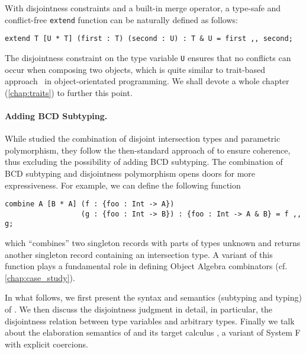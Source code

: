 With disjointness constraints and a built-in merge operator, a type-safe and
conflict-free \lstinline{extend} function can be naturally defined as follows:
\begin{lstlisting}
extend T [U * T] (first : T) (second : U) : T & U = first ,, second;
\end{lstlisting}
The disjointness constraint on the type variable \lstinline{U} ensures that no
conflicts can occur when composing two objects, which is quite similar to
trait-based approach~\citep{scharli2003traits} in object-orientated programming.
We shall devote a whole chapter (\cref{chap:traits}) to further this point.


\paragraph{Adding BCD Subtyping.}

While \citet{alpuimdisjoint} studied the combination of disjoint intersection
types and parametric polymorphism, they follow the then-standard approach
of \citet{oliveira2016disjoint} to ensure coherence, thus excluding the
possibility of adding BCD subtyping. The combination of BCD subtyping and
disjointness polymorphism opens doors for more expressiveness. For example, we can
define the following function
\begin{lstlisting}
combine A [B * A] (f : {foo : Int -> A})
                  (g : {foo : Int -> B}) : {foo : Int -> A & B} = f ,, g;
\end{lstlisting}
which ``combines'' two singleton records with parts of types unknown and returns
another singleton record containing an intersection type. A variant of this
function plays a fundamental role in defining Object Algebra combinators (cf.
\cref{chap:case_study}).




In what follows, we first present the syntax and semantics (subtyping and
typing) of \fnamee. We then discuss the disjointness judgment in detail, in
particular, the disjointness relation between type variables and arbitrary
types. Finally we talk about the elaboration semantics of \fnamee and its target
calculus \tnamee, a variant of System F with explicit coercions.



